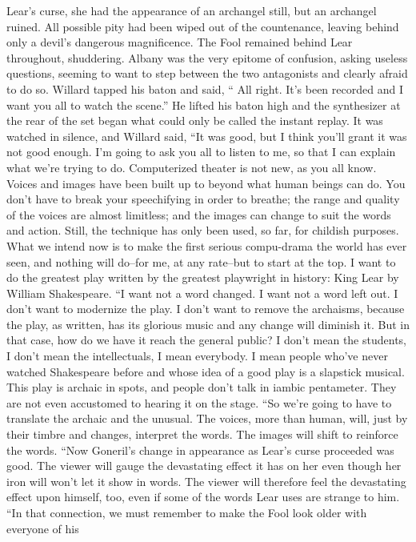 \documentclass[a4paper,12pt]{article}
\begin{document}
Lear’s curse, she had the appearance of an archangel still, but an archangel ruined. All possible pity had
been wiped out of the countenance, leaving behind only a devil’s dangerous magnificence.
The Fool remained behind Lear throughout, shuddering. Albany was the very epitome of
confusion, asking useless questions, seeming to want to step between the two antagonists and clearly afraid
to do so.
Willard tapped his baton and said, “ All right. It’s been recorded and I want you all to watch the
scene.” He lifted his baton high and the synthesizer at the rear of the set began what could only be called
the instant replay.
It was watched in silence, and Willard said, “It was good, but I think you’ll grant it was not good
enough. I’m going to ask you all to listen to me, so that I can explain what we’re trying to do.
Computerized theater is not new, as you all know. Voices and images have been built up to beyond what
human beings can do. You don’t have to break your speechifying in order to breathe; the range and quality
of the voices are almost limitless; and the images can change to suit the words and action. Still, the
technique has only been used, so far, for childish purposes. What we intend now is to make the first serious
compu-drama the world has ever seen, and nothing will do--for me, at any rate--but to start at the top. I
want to do the greatest play written by the greatest playwright in history: King Lear by William
Shakespeare.
“I want not a word changed. I want not a word left out. I don’t want to modernize the play. I don’t
want to remove the archaisms, because the play, as written, has its glorious music and any change will
diminish it. But in that case, how do we have it reach the general public? I don’t mean the students, I don’t
mean the intellectuals, I mean everybody. I mean people who’ve never watched Shakespeare before and
whose idea of a good play is a slapstick musical. This play is archaic in spots, and people don’t talk in
iambic pentameter. They are not even accustomed to hearing it on the stage.
“So we’re going to have to translate the archaic and the unusual. The voices, more than human,
will, just by their timbre and changes, interpret the words. The images will shift to reinforce the words.
“Now Goneril’s change in appearance as Lear’s curse proceeded was good. The viewer will gauge
the devastating effect it has on her even though her iron will won’t let it show in words. The viewer will
therefore feel the devastating effect upon himself, too, even if some of the words Lear uses are strange to
him.
“In that connection, we must remember to make the Fool look older with everyone of his
\end{document}
